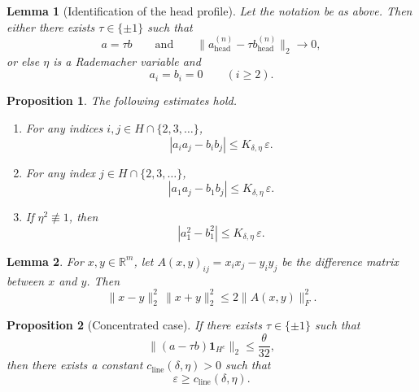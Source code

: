 \documentclass[10pt,a4paper]{amsart}
\newtheorem{lemma}{Lemma}
\newtheorem{proposition}{Proposition}
\newcommand{\R}{\mathbb R}
\newcommand{\eps}{\varepsilon}
\newcommand{\norm}[1]{\lVert #1 \rVert}
\begin{document}
\begin{lemma}[Identification of the head profile]\label{lem:head-sign}
Let the notation be as above. Then either there exists $\tau\in\{\pm1\}$ such that
\[
a=\tau b
\qquad\text{and}\qquad
\norm{a_{\mathrm{head}}^{(n)}-\tau b_{\mathrm{head}}^{(n)}}_2\to0,
\]
or else $\eta$ is a Rademacher variable and
\[
a_i=b_i=0
\qquad(i\ge2).
\]
\end{lemma}

\begin{proposition}
\label{prop:head-entry}
The following estimates hold.
\begin{enumerate}[label=\rm(\arabic*)]
\item For any indices $i,j\in H\cap\{2,3,\dots\}$,
\[
|a_i a_j-b_i b_j|\le K_{\delta,\eta}\,\eps.
\]
\item For any index $j\in H\cap\{2,3,\dots\}$,
\[
|a_1a_j-b_1b_j|\le K_{\delta,\eta}\,\eps.
\]
\item If $\eta^2\not\equiv1$, then
\[
|a_1^2-b_1^2|\le K_{\delta,\eta}\,\eps.
\]
\end{enumerate}
\end{proposition}

\begin{lemma}\label{lem:rank-one}
For $x,y\in\R^m$, let $A(x,y)_{ij}=x_ix_j-y_iy_j$ be the difference matrix between $x$ and $y$. Then
\[
\norm{x-y}_2^2\,\norm{x+y}_2^2\le 2\norm{A(x,y)}_F^2.
\]
\end{lemma}

\begin{proposition}[Concentrated case]\label{prop:concentrated}
If there exists $\tau\in\{\pm 1\}$ such that
\[
\norm{(a-\tau b)\mathbf 1_{H^c}}_2\le \frac{\theta}{32},
\]
then there exists a constant $c_{\mathrm{line}}(\delta,\eta)>0$ such that
\[
\eps\ge c_{\mathrm{line}}(\delta,\eta).
\]
\end{proposition}
\end{document}
